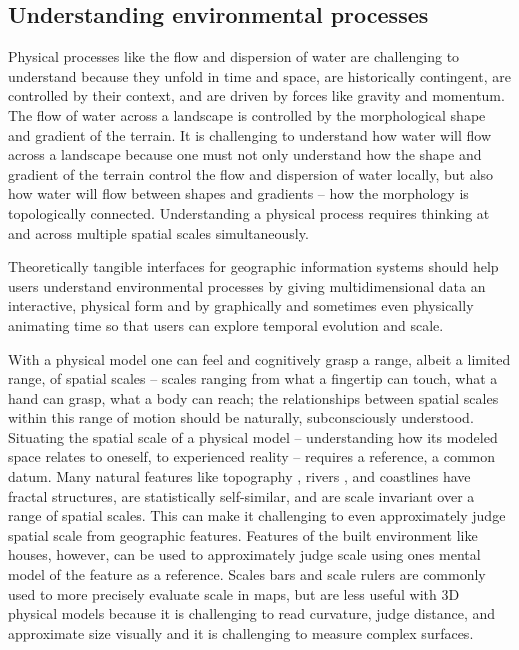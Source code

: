 \documentclass{article}
\begin{document}

\subsection{Understanding environmental processes}

Physical processes like the flow and dispersion of water are challenging to understand because they unfold in time and space, are historically contingent, are controlled by their context, and are driven by forces like gravity and momentum. The flow of water across a landscape is controlled by the morphological shape and gradient of the terrain. It is challenging to understand how water will flow across a landscape because one must not only understand how the shape and gradient of the terrain control the flow and dispersion of water locally, but also how water will flow between shapes and gradients – how the morphology is topologically connected. Understanding a physical process requires thinking at and across multiple spatial scales simultaneously. 

Theoretically tangible interfaces for geographic information systems should help users understand environmental processes
by giving multidimensional data an interactive, physical form 
and
by graphically and sometimes even physically animating time so that users can explore temporal evolution and scale.

With a physical model one can feel and cognitively grasp a range, albeit a limited range, of spatial scales 
-- scales ranging from what a fingertip can touch, what a hand can grasp, what a body can reach; 
the relationships between spatial scales within this range of motion 
should be naturally, subconsciously understood. 
%
Situating the spatial scale of a physical model  -- understanding how its modeled space relates to oneself, to experienced reality -- requires a reference, a common datum. 
%
Many natural features like topography \citep{Pelletier1996}, rivers \citep{Rodriguez-Iturbe1994,Tarboton1988}, and coastlines \citep{Mandelbrot1967} have fractal structures, are statistically self-similar, and are scale invariant over a range of spatial scales.
%
This can make it challenging to even approximately judge spatial scale from geographic features. 
Features of the built environment like houses, however, can be used to approximately judge scale 
using ones mental model of the feature as a reference. 
Scales bars and scale rulers are commonly used to more precisely evaluate scale in maps, 
but are less useful with 3D physical models 
because it is challenging to read curvature, judge distance, and approximate size visually
\citep{Howard2012b,Howard2012c, Jeannerod1997}
and it is challenging to measure complex surfaces. 
%
\end{document}
